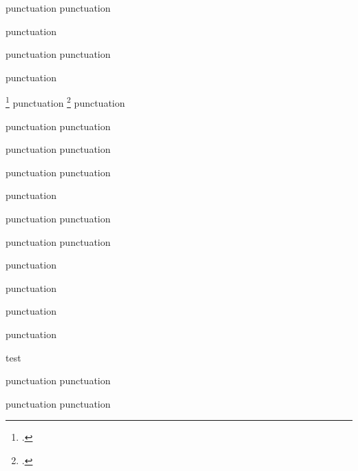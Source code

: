 

\cite[ prenote ][ postnote ]{ key } punctuation
\cite*[ prenote ][ postnote ]{ key } punctuation

\Cite[ prenote ][ postnote ]{ key } punctuation

\parencite[ prenote ][ postnote ]{ key } punctuation
\parencite*[ prenote ][ postnote ]{ key } punctuation

\Parencite[ prenote ][ postnote ]{ key } punctuation

\footcite[ prenote ][ postnote ]{ key } punctuation
\Footcite[ prenote ][ postnote ]{ key } punctuation

\textcite[ prenote ][ postnote ]{ key } punctuation
\Textcite[ prenote ][ postnote ]{ key } punctuation

\autocite[ prenote ][ postnote ]{ key } punctuation
\Autocite[ prenote ][ postnote ]{ key } punctuation

\autocite*[ prenote ][ postnote ]{ key } punctuation
\Autocite*[ prenote ][ postnote ]{ key } punctuation

\supercite{ key } punctuation

\citeauthor[ prenote ][ postnote ]{ key } punctuation
 punctuation

 punctuation
 punctuation

\citeyear[ prenote ][ postnote ]{ key } punctuation

 punctuation

\nocite{ key }

 punctuation

 punctuation

\parencites(and chapter $\exp 0 = 1$ 3)[35]{key1}[78]{key2}[23]{key3}
\parencites(and chapter \(\exp 0 =
 1\) 3)[35]{key1}[78]{key2}[23]{key3}
\parencites(and chapter \(\exp 0 =  1\) 3)[35]{key1}[78]{key2}[23]{key3}

\parencites(Compare)()[35]{key1}[78]{key2}[23]{key3} test \label{test}
\parencites(See)(and the introduction)[35]{key1}[78]{key2}[23]{key3}

\cites[ pre ][ post ]{ key } [ pre ][ post ]{ key } punctuation 
\Cites[ pre ][ post ]{ key } [ pre ][ post ]{ key } punctuation


\cites( pre )( post )[ pre ][ post ]{ key }[ pre ][ post ]{ key } punctuation
\Cites( pre )( post )[ pre ][ post ]{ key }[ pre ][ post ]{ key } punctuation


